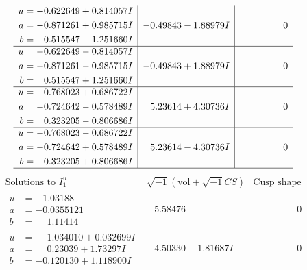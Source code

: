 \documentclass[1p]{elsarticle_modified}
\theoremstyle{definition}
\newcommand{\I}{\sqrt{-1}}
\begin{document}
$$\begin{array}{c|c|c}
\begin{aligned}
u &= -0.622649 + 0.814057 I \\
a &= -0.871261 + 0.985715 I \\
b &= \phantom{-}0.515547 - 1.251660 I\end{aligned}
 & -0.49843 - 1.88979 I & \phantom{-0.000000 } 0 \\ \hline\begin{aligned}
u &= -0.622649 - 0.814057 I \\
a &= -0.871261 - 0.985715 I \\
b &= \phantom{-}0.515547 + 1.251660 I\end{aligned}
 & -0.49843 + 1.88979 I & \phantom{-0.000000 } 0 \\ \hline\begin{aligned}
u &= -0.768023 + 0.686722 I \\
a &= -0.724642 - 0.578489 I \\
b &= \phantom{-}0.323205 - 0.806686 I\end{aligned}
 & \phantom{-}5.23614 + 4.30736 I & \phantom{-0.000000 } 0 \\ \hline\begin{aligned}
u &= -0.768023 - 0.686722 I \\
a &= -0.724642 + 0.578489 I \\
b &= \phantom{-}0.323205 + 0.806686 I\end{aligned}
 & \phantom{-}5.23614 - 4.30736 I & \phantom{-0.000000 } 0\\
 \hline 
 \end{array}$$\newpage$$\begin{array}{c|c|c}  
\text{Solutions to }I^u_{1}& \I (\text{vol} + \sqrt{-1}CS) & \text{Cusp shape}\\
 \hline 
\begin{aligned}
u &= -1.03188\phantom{ +0.000000I} \\
a &= -0.0355121\phantom{ +0.000000I} \\
b &= \phantom{-}1.11414\phantom{ +0.000000I}\end{aligned}
 & -5.58476\phantom{ +0.000000I} & \phantom{-0.000000 } 0 \\ \hline\begin{aligned}
u &= \phantom{-}1.034010 + 0.032699 I \\
a &= \phantom{-}0.23039 + 1.73297 I \\
b &= -0.120130 + 1.118900 I\end{aligned}
 & -4.50330 - 1.81687 I & \phantom{-0.000000 } 0 \\ \hline\begin{aligned}

\end{aligned}
\end{array}$$
\end{document}

